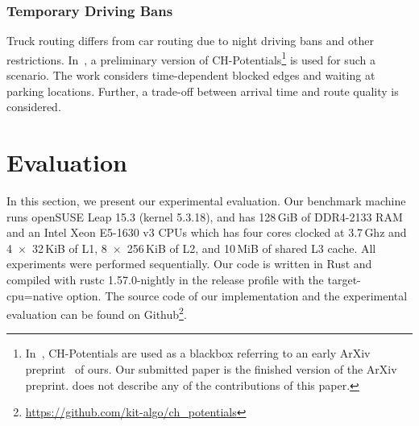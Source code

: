 \documentclass[manuscript,review]{acmart}
\begin{document}

\subsubsection{Temporary Driving Bans}

Truck routing differs from car routing due to night driving bans and other restrictions.
In~\cite{kswz-erptd-p-20}, a preliminary version of CH-Potentials\footnote{
In~\cite{kswz-erptd-p-20}, CH-Potentials are used as a blackbox referring to an early ArXiv preprint~\cite{strasser2019perfect} of ours.
Our submitted paper is the finished version of the ArXiv preprint.
\cite{kswz-erptd-p-20} does not describe any of the contributions of this paper.
} is used for such a scenario.
The work considers time-dependent blocked edges and waiting at parking locations.
Further, a trade-off between arrival time and route quality is considered.

\section{Evaluation}

\label{sec:experiments}

\begin{table}
\centering
\caption{Instances used in the evaluation with preprocessing running times to construct a CH or CCH-Potential. With CCH-Potentials $w_{\ell}$ can be updated by rerunning Phase 2 again.}\label{tab:graphs}

\end{table}

In this section, we present our experimental evaluation.
Our benchmark machine runs openSUSE Leap 15.3 (kernel 5.3.18), and has 128\,GiB of DDR4-2133 RAM and an Intel Xeon E5-1630 v3 CPUs which has four cores clocked at 3.7\,Ghz and 4~$\times$~32\,KiB of L1, 8~$\times$~256\,KiB of L2, and 10\,MiB of shared L3 cache.
All experiments were performed sequentially.
Our code is written in Rust and compiled with rustc 1.57.0-nightly in the release profile with the target-cpu=native option.
The source code of our implementation and the experimental evaluation can be found on Github\footnote{\url{https://github.com/kit-algo/ch_potentials}}.
\end{document}
